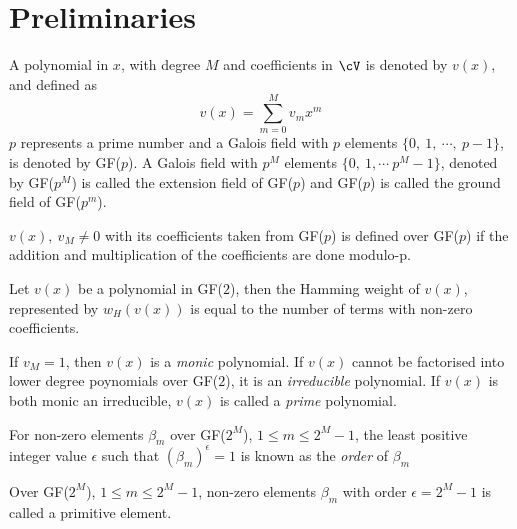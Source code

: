 \section{Preliminaries}
\label{secPrelim}

A polynomial in $x$, with degree $M$ and coefficients in $\cV$ is denoted by $v(x)$, and defined as 
\begin{equation*}
v(x) = \sum_{m=0}^{M} v_mx^m
\end{equation*}
$p$ represents a prime number and a Galois field with $p$ elements $\{0,~1,~\cdots,~p-1 \}$, is denoted by GF($p$). A Galois field with $p^M$ elements $\{0,~1,\cdots~p^M-1 \}$, denoted by GF($p^M$) is called the extension field of GF($p$) and GF($p$) is called the ground field of GF($p^m$).

$v(x),~v_M \neq 0$ with its coefficients taken from GF($p$) is defined over GF($p$) if the addition and multiplication of the coefficients are done modulo-p. 


\begin{definition}
Let $v(x)$ be a polynomial in GF($2$), then the Hamming weight of $v(x)$, represented by $w_H(v(x))$ is equal to the number of terms with non-zero coefficients.
\end{definition}

\begin{definition}
If $v_M=1$, then $v(x)$ is a \textit{monic} polynomial. If $v(x)$ cannot be factorised into lower degree poynomials over GF($2$), it is an \textit{irreducible} polynomial. If $v(x)$ is both monic an irreducible, $v(x)$ is called a \textit{prime} polynomial.
\end{definition}

\begin{definition}
For non-zero elements  $\beta_m$ over GF($2^M$), $1 \leq m \leq 2^M-1$, the least positive integer value $\epsilon$ such that $(\beta_m)^{\epsilon}=1$ is known as the \textit{order} of $\beta_m$
\end{definition}

\begin{definition}
Over GF($2^M$), $1 \leq m \leq 2^M-1$, non-zero elements  $\beta_m$ with order $\epsilon=2^M-1$ is called a primitive element.
\end{definition}

